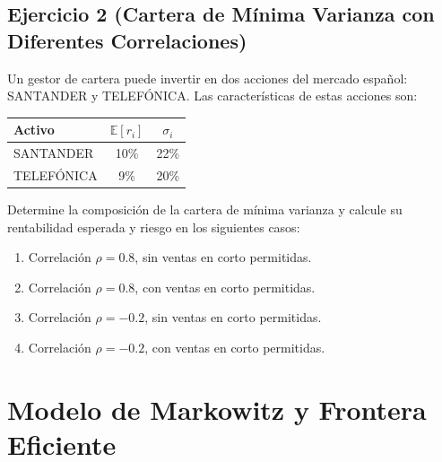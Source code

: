 \documentclass[12pt,a4paper]{article}
\newcommand{\E}{\mathbb{E}}
\newenvironment{ejercicio}[1]{\subsection*{Ejercicio #1}}{}
\begin{document}
\begin{ejercicio}{2 (Cartera de Mínima Varianza con Diferentes Correlaciones)}
Un gestor de cartera puede invertir en dos acciones del mercado español: SANTANDER y TELEFÓNICA. Las características de estas acciones son:
\begin{center}
\begin{tabular}{lcc}
\toprule
Activo & $\E[r_i]$ & $\sigma_i$ \\
\midrule
SANTANDER & 10\% & 22\% \\
TELEFÓNICA & 9\% & 20\% \\
\bottomrule
\end{tabular}
\end{center}

Determine la composición de la cartera de mínima varianza y calcule su rentabilidad esperada y riesgo en los siguientes casos:
\begin{enumerate}[label=\alph*)]
  \item Correlación $\rho = 0.8$, sin ventas en corto permitidas.
  \item Correlación $\rho = 0.8$, con ventas en corto permitidas.
  \item Correlación $\rho = -0.2$, sin ventas en corto permitidas.
  \item Correlación $\rho = -0.2$, con ventas en corto permitidas.
\end{enumerate}
\end{ejercicio}

\section{Modelo de Markowitz y Frontera Eficiente}
\end{document}
